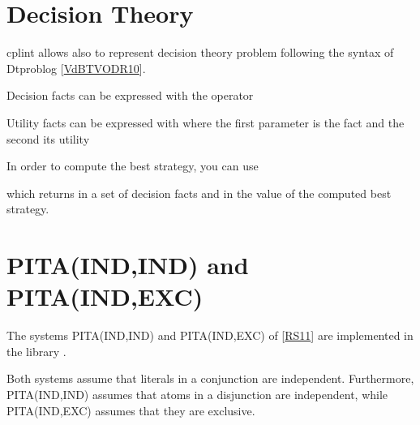 \documentclass[letterpaper,10pt,english]{sphinxmanual}
\begin{document}
\section{Decision Theory}
\label{\detokenize{index:decision-theory}}
\sphinxAtStartPar
cplint allows also to represent decision theory problem following the syntax of Dtproblog {[}\hyperlink{cite.index:id73}{VdBTVODR10}{]}.

\sphinxAtStartPar
Decision facts can be expressed with the operator 

\begin{sphinxVerbatim}[commandchars=\\\{\}]
  
\end{sphinxVerbatim}

\sphinxAtStartPar
Utility facts can be expressed with  where the first parameter is the fact and the second its utility

\begin{sphinxVerbatim}[commandchars=\\\{\}]
\end{sphinxVerbatim}

\sphinxAtStartPar
In order to compute the best strategy, you can use 

\begin{sphinxVerbatim}[commandchars=\\\{\}]
\end{sphinxVerbatim}

\sphinxAtStartPar
which returns in  a set of decision facts and in  the value of the computed best strategy.


\section{PITA(IND,IND) and PITA(IND,EXC)}
\label{\detokenize{index:pita-ind-ind-and-pita-ind-exc}}
\sphinxAtStartPar
The systems PITA(IND,IND) and PITA(IND,EXC) of {[}\hyperlink{cite.index:id74}{RS11}{]} are
implemented in the library .

\sphinxAtStartPar
Both systems assume that literals in a conjunction are independent.
Furthermore, PITA(IND,IND) assumes that atoms in a disjunction are independent,
while PITA(IND,EXC) assumes that they are exclusive.
\end{document}
